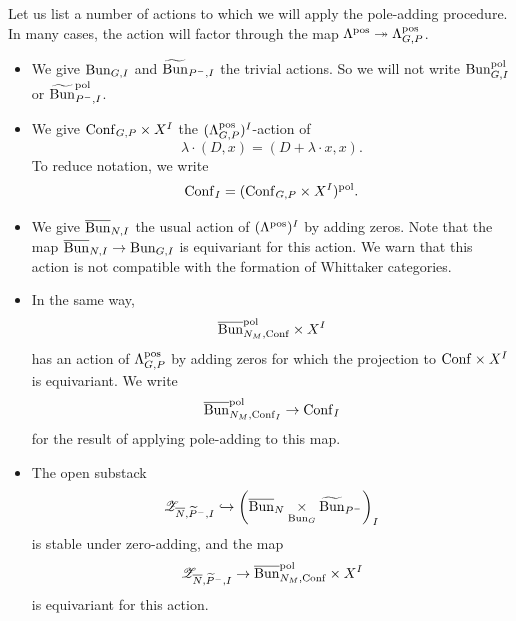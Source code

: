 \subsubsection{} Let us list a number of actions to which we will apply the pole-adding procedure. In many cases, the action will factor through the map $\Lambda^{\mathrm{pos}} \twoheadrightarrow \Lambda_{G,P}^{\mathrm{pos}}$.
\begin{itemize}
    \item We give $\mathrm{Bun}_{G,I}$ and $\widetilde{\mathrm{Bun}}_{P^-, I}$ the trivial actions. So we will not write $\mathrm{Bun}_{G,I}^{\mathrm{pol}}$ or $\widetilde{\mathrm{Bun}}_{P^-, I}^{\mathrm{pol}}$.
    \item We give $\mathrm{Conf}_{G,P} \times X^I$ the $(\Lambda_{G,P}^{\mathrm{pos}})^I$-action of
        \[\lambda \cdot (D, x) = (D + \lambda \cdot x, x).\]
    To reduce notation, we write
        \[\mathrm{Conf}_I = (\mathrm{Conf}_{G,P} \times X^I)^{\mathrm{pol}}.\]
    \item We give $\overline{\mathrm{Bun}}_{N,I}$ the usual action of $(\Lambda^{\mathrm{pos}})^I$ by adding zeros. Note that the map $\overline{\mathrm{Bun}}_{N,I} \to \mathrm{Bun}_{G,I}$ is equivariant for this action. We warn that this action is not compatible with the formation of Whittaker categories.
    \item In the same way,
        \[\overline{\mathrm{Bun}}_{N_M, \mathrm{Conf}}^{\mathrm{pol}} \times X^I\]
    has an action of $\Lambda_{G,P}^{\mathrm{pos}}$ by adding zeros for which the projection to $\mathrm{Conf} \times X^I$ is equivariant. We write
        \[\overline{\mathrm{Bun}}_{N_M, \mathrm{Conf}_I}^{\mathrm{pol}} \to \mathrm{Conf}_I\]
    for the result of applying pole-adding to this map.
    \item The open substack
        \[
        \mathscr{Z}_{\overline{N}, \widetilde{P}^-, I}
        \hookrightarrow \left(\overline{\mathrm{Bun}}_N \underset{\mathrm{Bun}_G}{\times} \widetilde{\mathrm{Bun}}_{P^-}\right)_I
        \]
    is stable under zero-adding, and the map
        \[
        \mathscr{Z}_{\overline{N}, \widetilde{P}^-, I}
        \to \overline{\mathrm{Bun}}_{N_M, \mathrm{Conf}}^{\mathrm{pol}} \times X^I
        \]
    is equivariant for this action.
\end{itemize}

